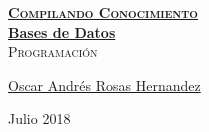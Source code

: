 \documentclass[12pt, fleqn]{report}                             %
\author{Oscar Andrés Rosas}                                     %
\theoremstyle{break}                                            %
\begin{document}
\begin{titlepage}
    
    \pagecolor{TitlePageColor}                                      %
    \color{white}                                                   %

    \vspace                                                         %
    \baselineskip                                                   %

    \makebox[0pt][l]{\rule{1.3\textwidth}{3pt}}                     %
    
    \href{https://compilandoconocimiento.com}                       %
    {\textbf{\textsc{\Huge Compilando Conocimiento}}}\\[2.7cm]      %

    \href{\ProjectNameLink}                                         %
    {\fontsize{65}{78}\selectfont \textbf{Bases de Datos}}\\[0.5cm] %
    \textcolor{ColorSubtext}{\textsc{\Huge Programación}}           %
    
    \vfill                                                          %
    
    \href{\ProjectAuthorLink}                                       %
    {\LARGE \textsf{Oscar Andrés Rosas Hernandez}}                  %

    \vspace                                                         %
    \baselineskip                                                   %
    
    {\large \textsf{Julio 2018}}                                    %

\end{titlepage}
\end{document}
